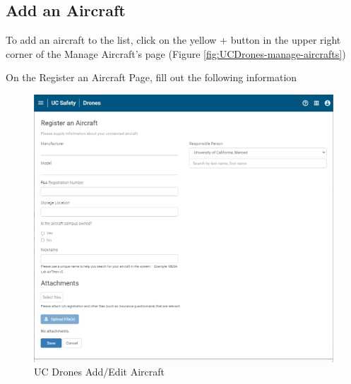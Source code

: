 \documentclass[
  12pt,
]{book}
\begin{document}
\hypertarget{add-an-aircraft}{%
\subsection{Add an Aircraft}\label{add-an-aircraft}}

To add an aircraft to the list, click on the yellow + button in the upper right corner of the Manage Aircraft's page (Figure \ref{fig:UCDrones-manage-aircrafts})

On the Register an Aircraft Page, fill out the following information

\begin{figure}

{\centering \includegraphics[width=0.95\linewidth]{images/UCDrones_aircraft} 

}

\caption{UC Drones Add/Edit Aircraft}\label{fig:UCDrones-edit-aircrafts}
\end{figure}
\end{document}
